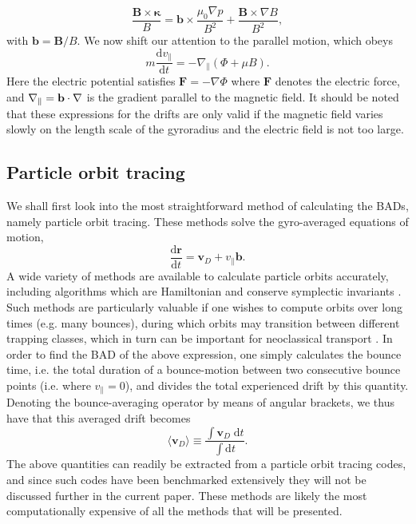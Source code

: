 \begin{equation}
    \frac{\mathbf{B} \times \boldsymbol{\kappa}}{B} = \mathbf{b} \times \frac{\mu_0 \nabla p}{B^2} + \frac{\mathbf{B} \times \nabla B}{B^2},
    \label{eq:relation-gradandcurv}
\end{equation}
with $\mathbf{b}=\mathbf{B}/B$. We now shift our attention to the parallel motion, which obeys
\begin{equation}
    m \frac{\mathrm{d} v_\parallel }{\mathrm{d} t} = - \nabla_\parallel ( \Phi + \mu B ).
\end{equation}
Here the electric potential satisfies $\mathbf{F} = - \nabla \Phi$ where $\mathbf{F}$ denotes the electric force, and $\nabla_\parallel = {\bf b} \cdot \nabla $ is the gradient parallel to the magnetic field. It should be noted that these expressions for the drifts are only valid if the magnetic field varies slowly on the length scale of the gyroradius and the electric field is not too large.
\subsection{Particle orbit tracing} \label{sec:orbit}
We shall first look into the most straightforward method of calculating the BADs, namely particle orbit tracing. These methods solve the gyro-averaged equations of motion,
\begin{equation}
    \frac{\mathrm{d} \mathbf{r}}{\mathrm{d} t} =\mathbf{v}_D + v_\parallel \mathbf{b}.
\end{equation}
A wide variety of methods are available to calculate particle orbits accurately, including algorithms which are Hamiltonian and conserve symplectic invariants \cite{albert2020accelerated}. Such methods are particularly valuable if one wishes to compute orbits over long times (e.g. many bounces), during which orbits may transition between different trapping classes, which in turn can be important for neoclassical transport \cite{paul2022energetic}. In order to find the BAD of the above expression, one simply calculates the bounce time, i.e. the total duration of a bounce-motion between two consecutive bounce points (i.e. where $v_\parallel = 0$), and divides the total experienced drift by this quantity. Denoting the bounce-averaging operator by means of angular brackets, we thus have that this averaged drift becomes
\begin{equation}
    \langle \mathbf{v}_D \rangle \equiv \frac{ \int \mathbf{v}_D \; \mathrm{d} t }{\int \mathrm{d} t}.
\end{equation}
The above quantities can readily be extracted from a particle orbit tracing codes, and since such codes have been benchmarked extensively they will not be discussed further in the current paper. These methods are likely the most computationally expensive of all the methods that will be presented. 
